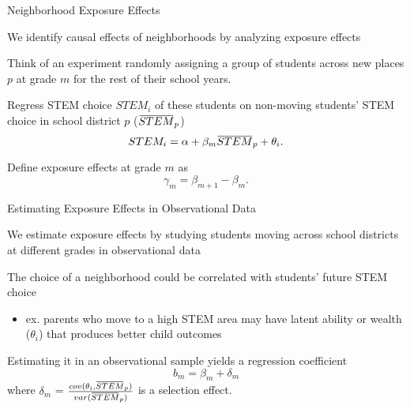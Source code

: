 \documentclass[aspectratio=169,xcolor=dvipsnames]{beamer}
\newcommand{\overbar}[1]{\mkern 1.5mu\overline{\mkern-1.5mu#1\mkern-1.5mu}\mkern 1.5mu}
\newenvironment{wideitemize}{\itemize\addtolength{\itemsep}{10pt}}{\enditemize}
\begin{document}
\begin{frame}{Neighborhood Exposure Effects}
    \begin{wideitemize}
        \item We identify causal effects of neighborhoods by analyzing exposure effects
        \item Think of an experiment randomly assigning a group of students across new places $p$ at grade $m$ for the rest of their school years. 
        \item Regress STEM choice $STEM_i$ of these students on non-moving students’ STEM choice in school district $p$ ($\overbar{STEM}_p$)
        \begin{equation}
        STEM_i = \alpha + \beta_m\overbar{STEM}_p + \theta_i.
        \end{equation}
        \item  Define exposure effects at grade $m$ as 
    $$\gamma_m =  \beta_{m+1} - \beta_{m}.$$
    \end{wideitemize}
\end{frame}

\begin{frame}{Estimating Exposure Effects in Observational Data}
\begin{wideitemize}
    \item We estimate exposure effects by studying students moving across school districts at different grades in observational data
    \item The choice of a neighborhood could be correlated with students’ future STEM choice
    \begin{itemize}
        \item ex. parents who move to a high STEM area may have latent ability or wealth ($\theta_i$) that produces better child outcomes
    \end{itemize}
    \item Estimating it in an observational sample yields a regression coefficient
    \begin{equation}
        b_m = \beta_m + \delta_m
    \end{equation}
    where $\delta_m$ = $\frac{cov(\theta_i, \overbar{STEM}_p)}{var(\overbar{STEM}_p)}$ is a selection effect.
\end{wideitemize}
\end{frame}
\end{document}
